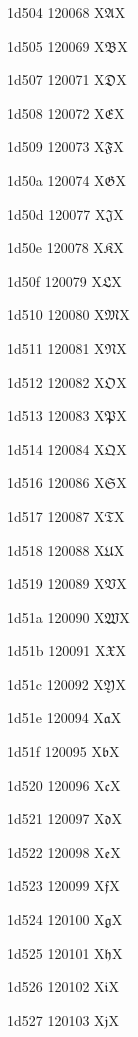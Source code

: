 \documentclass[11pt]{article}
\begin{document}
1d504 120068 X{\ensuremath{\mathfrak{A}}}X

1d505 120069 X{\ensuremath{\mathfrak{B}}}X

1d507 120071 X{\ensuremath{\mathfrak{D}}}X

1d508 120072 X{\ensuremath{\mathfrak{E}}}X

1d509 120073 X{\ensuremath{\mathfrak{F}}}X

1d50a 120074 X{\ensuremath{\mathfrak{G}}}X

1d50d 120077 X{\ensuremath{\mathfrak{J}}}X

1d50e 120078 X{\ensuremath{\mathfrak{K}}}X

1d50f 120079 X{\ensuremath{\mathfrak{L}}}X

1d510 120080 X{\ensuremath{\mathfrak{M}}}X

1d511 120081 X{\ensuremath{\mathfrak{N}}}X

1d512 120082 X{\ensuremath{\mathfrak{O}}}X

1d513 120083 X{\ensuremath{\mathfrak{P}}}X

1d514 120084 X{\ensuremath{\mathfrak{Q}}}X

1d516 120086 X{\ensuremath{\mathfrak{S}}}X

1d517 120087 X{\ensuremath{\mathfrak{T}}}X

1d518 120088 X{\ensuremath{\mathfrak{U}}}X

1d519 120089 X{\ensuremath{\mathfrak{V}}}X

1d51a 120090 X{\ensuremath{\mathfrak{W}}}X

1d51b 120091 X{\ensuremath{\mathfrak{X}}}X

1d51c 120092 X{\ensuremath{\mathfrak{Y}}}X

1d51e 120094 X{\ensuremath{\mathfrak{a}}}X

1d51f 120095 X{\ensuremath{\mathfrak{b}}}X

1d520 120096 X{\ensuremath{\mathfrak{c}}}X

1d521 120097 X{\ensuremath{\mathfrak{d}}}X

1d522 120098 X{\ensuremath{\mathfrak{e}}}X

1d523 120099 X{\ensuremath{\mathfrak{f}}}X

1d524 120100 X{\ensuremath{\mathfrak{g}}}X

1d525 120101 X{\ensuremath{\mathfrak{h}}}X

1d526 120102 X{\ensuremath{\mathfrak{i}}}X

1d527 120103 X{\ensuremath{\mathfrak{j}}}X
\end{document}
